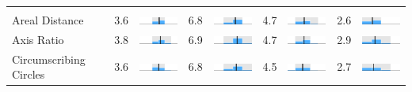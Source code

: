 \begin{table}
\begin{tabular}{l rm{7em} rm{7em} rm{7em} rm{7em}}
\\ \hline \\ 
Areal Distance         &   3.6 &       \includegraphics[width=7em]{mini_hist/WI_2004_dist_a} &   6.8 &       \includegraphics[width=7em]{mini_hist/WI_2008_dist_a} &   4.7 &       \includegraphics[width=7em]{mini_hist/WI_2012_dist_a} &   2.6 &       \includegraphics[width=7em]{mini_hist/WI_2016_dist_a} \\
Axis Ratio             &   3.8 &   \includegraphics[width=7em]{mini_hist/WI_2004_axis_ratio} &   6.9 &   \includegraphics[width=7em]{mini_hist/WI_2008_axis_ratio} &   4.7 &   \includegraphics[width=7em]{mini_hist/WI_2012_axis_ratio} &   2.9 &   \includegraphics[width=7em]{mini_hist/WI_2016_axis_ratio} \\
Circumscribing Circles &   3.6 &        \includegraphics[width=7em]{mini_hist/WI_2004_reock} &   6.8 &        \includegraphics[width=7em]{mini_hist/WI_2008_reock} &   4.5 &        \includegraphics[width=7em]{mini_hist/WI_2012_reock} &   2.7 &        \includegraphics[width=7em]{mini_hist/WI_2016_reock} \\

\end{tabular}
\end{table}
